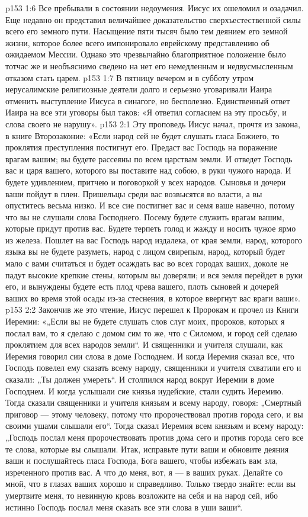 \vs p153 1:6 Все пребывали в состоянии недоумения. Иисус их ошеломил и озадачил. Еще недавно он представил величайшее доказательство сверхъестественной силы всего его земного пути. Насыщение пяти тысяч было тем деянием его земной жизни, которое более всего импонировало еврейскому представлению об ожидаемом Мессии. Однако это чрезвычайно благоприятное положение было тотчас же и необъяснимо сведено на нет его немедленным и недвусмысленным отказом стать царем.
\vs p153 1:7 В пятницу вечером и в субботу утром иерусалимские религиозные деятели долго и серьезно уговаривали Иаира отменить выступление Иисуса в синагоге, но бесполезно. Единственный ответ Иаира на все эти уговоры был таков: «Я ответил согласием на эту просьбу, и слова своего не нарушу».
\vs p153 2:1 Эту проповедь Иисус начал, прочтя из закона, в книге Второзаконие: «Если народ сей не будет слушать гласа Божиего, то проклятия преступления постигнут его. Предаст вас Господь на поражение врагам вашим; вы будете рассеяны по всем царствам земли. И отведет Господь вас и царя вашего, которого вы поставите над собою, в руки чужого народа. И будете удивлением, притчею и поговоркой у всех народов. Сыновья и дочери ваши пойдут в плен. Пришельцы среди вас возвысятся во власти, а вы опуститесь весьма низко. И все сие постигнет вас и семя ваше навечно, потому что вы не слушали слова Господнего. Посему будете служить врагам вашим, которые придут против вас. Будете терпеть голод и жажду и носить чужое ярмо из железа. Пошлет на вас Господь народ издалека, от края земли, народ, которого языка вы не будете разуметь, народ с лицом свирепым, народ, который будет мало с вами считаться и будет осаждать вас во всех городах ваших, доколе не падут высокие крепкие стены, которым вы доверяли; и вся земля перейдет в руки его, и вынуждены будете есть плод чрева вашего, плоть сыновей и дочерей ваших во время этой осады из\hyp{}за стеснения, в которое ввергнут вас враги ваши».
\vs p153 2:2 Закончив же это чтение, Иисус перешел к Пророкам и прочел из Книги Иеремии: «„Если вы не будете слушать слов слуг моих, пророков, которых я послал вам, то я сделаю с домом сим то же, что с Силомом, и город сей сделаю проклятием для всех народов земли“. И священники и учителя слушали, как Иеремия говорил сии слова в доме Господнем. И когда Иеремия сказал все, что Господь повелел ему сказать всему народу, священники и учителя схватили его и сказали: „Ты должен умереть“. И столпился народ вокруг Иеремии в доме Господнем. И когда услышали сие князья иудейские, стали судить Иеремию. Тогда сказали священники и учителя князьям и всему народу, говоря: „Смертный приговор --- этому человеку, потому что пророчествовал против города сего, и вы своими ушами слышали его“. Тогда сказал Иеремия всем князьям и всему народу: „Господь послал меня пророчествовать против дома сего и против города сего все те слова, которые вы слышали. Итак, исправьте пути ваши и обновите деяния ваши и послушайтесь гласа Господа, Бога вашего, чтобы избежать вам зла, изреченного против вас. А что до меня, вот, я --- в ваших руках. Делайте со мной, что в глазах ваших хорошо и справедливо. Только твердо знайте: если вы умертвите меня, то невинную кровь возложите на себя и на народ сей, ибо истинно Господь послал меня сказать все эти слова в уши ваши“.
